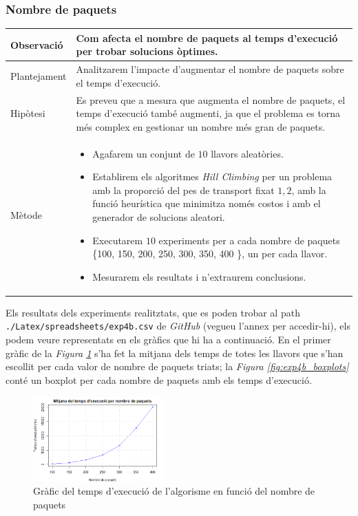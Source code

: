 \documentclass[a4paper]{article}
\begin{document}
	\subsubsection{Nombre de paquets}
	\begin{table}[ht]
		\centering
		\begin{tabular}{|l|p{10cm}|}
			\hline
			Observació & Com afecta el nombre de paquets al temps d'execució per trobar solucions òptimes. \\
			\hline
			Plantejament & Analitzarem l'impacte d'augmentar el nombre de paquets sobre el temps d'execució.\\
			\hline
			Hipòtesi & Es preveu que a mesura que augmenta el nombre de paquets, el temps d'execució també augmenti, ja que el problema es torna més complex en gestionar un nombre més gran de paquets.\\
			\hline
			Mètode &
			\begin{itemize}
				\item Agafarem un conjunt de $10$ llavors aleatòries.
				\item Establirem els algoritmes \textit{Hill Climbing} per un problema amb la proporció del pes de transport fixat  $1,2$, amb la funció heurística que minimitza només costos i amb el generador de solucions aleatori.
				\item Executarem $10$ experiments per a cada nombre de paquets \{100, 150, 200, 250, 300, 350, 400 \}, un per cada llavor.
				\item Mesurarem els resultats i n'extraurem conclusions.
			\end{itemize} \\
			\hline
		\end{tabular}
		\label{tab:exp4b_apartats}
	\end{table}
	
	Els resultats dels experiments realitztats, que es poden trobar al path \texttt{./Latex/spreadsheets/exp4b.csv} de \textit{GitHub} (vegueu l'annex per accedir-hi), els podem veure representats en els gràfics que hi ha a continuació. En el primer gràfic de la \textit{Figura \ref{fig:exp4b_grafic_lineal2}} s'ha fet la mitjana dels temps de totes les llavors que s'han escollit per cada valor de nombre de paquets triats; la \textit{Figura \ref{fig:exp4b_boxplots}} conté un boxplot per cada nombre de paquets amb els temps d'execució.\\

	\begin{figure}[H]
		\centering
		\includegraphics[width=0.45\textwidth]{images/exp4b_grafic_lineal2.png}
		\caption{Gràfic del temps d'execució de l'algorisme en funció del nombre de paquets}
		\label{fig:exp4b_grafic_lineal2}
	\end{figure}
	
\end{document}
